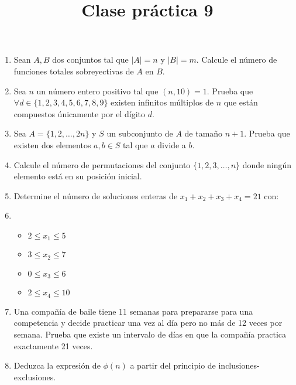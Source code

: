 \documentclass{article}
\title{Clase pr\'actica 9}
\begin{document}
\maketitle
\begin{enumerate}
	\item Sean $A, B$ dos conjuntos tal que $|A| = n$ y $|B| = m$. Calcule el n\'umero de funciones totales sobreyectivas de $A$ en $B$.
	\item Sea $n$ un n\'umero entero positivo tal que $( n, 10 ) = 1$. Prueba que $\forall d \in \{1,2,3,4,5,6,7,8,9\}$ existen infinitos m\'ultiplos de $n$ que est\'an compuestos \'unicamente por el d\'igito $d$.
	\item Sea $A = \{1,2, \dots , 2n\}$ y $S$ un subconjunto de $A$ de tama\~no $n+1$. Prueba que existen dos elementos $a,b \in S$ tal que $a$ divide a $b$.
	\item Calcule el n\'umero de permutaciones del conjunto $\{1,2,3, \dots ,n\}$ donde ning\'un elemento est\'a en su posici\'on inicial.
	\item Determine el n\'umero de soluciones enteras de $x_1 + x_2 + x_3 + x_4 = 21$ con:
	\item[] 
	\begin{itemize}
		\item $2 \leq x_1 \leq 5$
		\item $3 \leq x_2 \leq 7$
		\item $0 \leq x_3 \leq 6$
		\item $2 \leq x_4 \leq 10$
	\end{itemize}
	\item Una compa\~n\'ia de baile tiene 11 semanas para prepararse para una competencia y decide practicar una vez al d\'ia pero no m\'as de 12 veces por semana. Prueba que existe un intervalo de d\'ias en que la compa\~n\'ia practica exactamente 21 veces.
	\item Deduzca la expresi\'on de $\phi (n)$ a partir del principio de inclusiones-exclusiones.
\end{enumerate}
\end{document}
